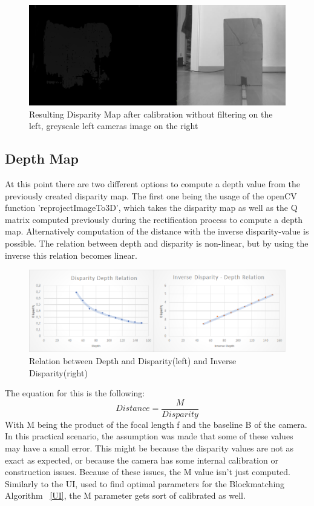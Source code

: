 \documentclass[journal,onecolumn]{IEEEtran}
\begin{document}
\begin{figure}[H]
	\centering
	\includegraphics[scale=0.5]{disparityMap.png}
	\captionsetup{justification=centering}
	\caption{Resulting Disparity Map after calibration without filtering on the left, greyscale left cameras image on the right}
\end{figure}

\subsection{Depth Map}
\noindent
\noindent At this point there are two different options to compute a depth value from the previously created disparity map. The first one being the usage of the openCV function 'reprojectImageTo3D', which takes the disparity map as well as the Q matrix computed  previously during the rectification process to compute a depth map.
Alternatively computation of the distance with the inverse disparity-value is possible. The relation between depth and disparity is non-linear, but by using the inverse this relation becomes linear.
\begin{figure}[H]
	\centering
	\includegraphics[scale=0.5]{ratios.png}
	\captionsetup{justification=centering}
	\caption{Relation between Depth and Disparity(left) and Inverse Disparity(right)}
\end{figure}
\noindent The equation for this is the following:
\begin{equation}
	Distance = \frac{M}{Disparity}
\end{equation}
\noindent With M being the product of the focal length f and the baseline B of the camera. \newline
In this practical scenario, the assumption was made that some of these values may have a small error. This might be because the disparity values are not as exact as expected, or because the camera has some internal calibration or construction issues. Because of these issues, the  M value isn't just computed. Similarly to the UI, used to find optimal parameters for the Blockmatching Algorithm ~\ref{UI}, the M parameter gets sort of calibrated as well.
\end{document}
